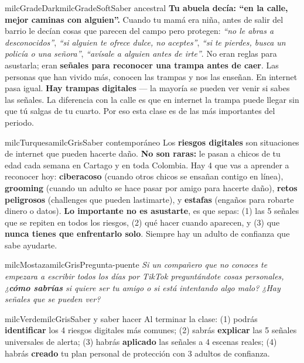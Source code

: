 \documentclass[11pt,letterpaper]{article}
\begin{document}
\begin{softbox}{milcGradeDark}{milcGradeSoft}{Saber ancestral}
\textbf{Tu abuela decía: ``en la calle, mejor caminas con alguien''.} Cuando tu mamá era niña, antes de salir del barrio le decían cosas que parecen del campo pero protegen: \emph{``no le abras a desconocidos''}, \emph{``si alguien te ofrece dulce, no aceptes''}, \emph{``si te pierdes, busca un policía o una señora''}, \emph{``avísale a alguien antes de irte''}. No eran reglas para asustarla; eran \textbf{señales para reconocer una trampa antes de caer}. Las personas que han vivido más, conocen las trampas y nos las enseñan. En internet pasa igual. \textbf{Hay trampas digitales} --- la mayoría se pueden ver venir si sabes las señales. La diferencia con la calle es que en internet la trampa puede llegar sin que tú salgas de tu cuarto. Por eso esta clase es de las más importantes del periodo.
\end{softbox}

\begin{softbox}{milcTurquesa}{milcGris}{Saber contemporáneo}
Los \textbf{riesgos digitales} son situaciones de internet que pueden hacerte daño. \textbf{No son raras:} le pasan a chicos de tu edad cada semana en Cartago y en toda Colombia. Hay 4 que vas a aprender a reconocer hoy: \textbf{ciberacoso} (cuando otros chicos se ensañan contigo en línea), \textbf{grooming} (cuando un adulto se hace pasar por amigo para hacerte daño), \textbf{retos peligrosos} (challenges que pueden lastimarte), y \textbf{estafas} (engaños para robarte dinero o datos). \textbf{Lo importante no es asustarte}, es que sepas: (1) las 5 señales que se repiten en todos los riesgos, (2) qué hacer cuando aparecen, y (3) que \textbf{nunca tienes que enfrentarlo solo}. Siempre hay un adulto de confianza que sabe ayudarte.
\end{softbox}

\begin{softbox}{milcMostaza}{milcGris}{Pregunta-puente}
\textit{Si un compañero que no conoces te empezara a escribir todos los días por TikTok preguntándote cosas personales, ¿\textbf{cómo sabrías} si quiere ser tu amigo o si está intentando algo malo? ¿Hay señales que se pueden ver?}
\end{softbox}

\begin{softbox}{milcVerde}{milcGris}{Saber y saber hacer}
Al terminar la clase: (1) podrás \textbf{identificar} los 4 riesgos digitales más comunes; (2) sabrás \textbf{explicar} las 5 señales universales de alerta; (3) habrás \textbf{aplicado} las señales a 4 escenas reales; (4) habrás \textbf{creado} tu plan personal de protección con 3 adultos de confianza.
\end{softbox}
\end{document}
